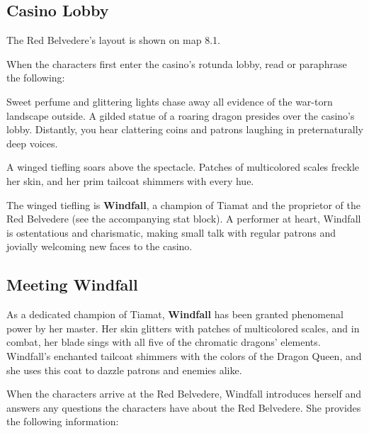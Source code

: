 \documentclass[10pt,a4paper,twoside,bg=print,twocolumn,openany,nodeprecatedcode]{dndbook}
\begin{document}
\subsection{Casino Lobby}
The Red Belvedere's layout is shown on map 8.1.

When the characters first enter the casino's rotunda lobby, read or paraphrase the following:

\begin{DndReadAloud}{}
Sweet perfume and glittering lights chase away all evidence of the war-torn landscape outside. A gilded statue of a roaring dragon presides over the casino's lobby. Distantly, you hear clattering coins and patrons laughing in preternaturally deep voices.

A winged tiefling soars above the spectacle. Patches of multicolored scales freckle her skin, and her prim tailcoat shimmers with every hue.

\end{DndReadAloud}

The winged tiefling is \textbf{Windfall}, a champion of Tiamat and the proprietor of the Red Belvedere (see the accompanying stat block). A performer at heart, Windfall is ostentatious and charismatic, making small talk with regular patrons and jovially welcoming new faces to the casino.

\subsection{Meeting Windfall}
As a dedicated champion of Tiamat, \textbf{Windfall} has been granted phenomenal power by her master. Her skin glitters with patches of multicolored scales, and in combat, her blade sings with all five of the chromatic dragons' elements. Windfall's enchanted tailcoat shimmers with the colors of the Dragon Queen, and she uses this coat to dazzle patrons and enemies alike.

When the characters arrive at the Red Belvedere, Windfall introduces herself and answers any questions the characters have about the Red Belvedere. She provides the following information:
\end{document}
